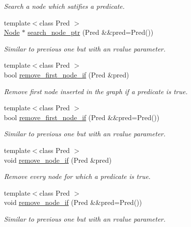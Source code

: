 \begin{DoxyCompactItemize}
\begin{DoxyCompactList}\small\item\em Search a node which satifies a predicate. \end{DoxyCompactList}\item 
{\footnotesize template$<$class Pred $>$ }\\\hyperlink{namespace_designar_a5af326c65aa2bd26b26c410f2030d09e}{Node} $\ast$ \hyperlink{class_designar_1_1_base_graph_af19f6876395f82edc748b8c7ec7413f8}{search\+\_\+node\+\_\+ptr} (Pred \&\&pred=Pred())
\begin{DoxyCompactList}\small\item\em Similar to previous one but with an rvalue parameter. \end{DoxyCompactList}\item 
{\footnotesize template$<$class Pred $>$ }\\bool \hyperlink{class_designar_1_1_base_graph_a1311af417ba4d373d7051b73cc2696ec}{remove\+\_\+first\+\_\+node\+\_\+if} (Pred \&pred)
\begin{DoxyCompactList}\small\item\em Remove first node inserted in the graph if a predicate is true. \end{DoxyCompactList}\item 
{\footnotesize template$<$class Pred $>$ }\\bool \hyperlink{class_designar_1_1_base_graph_aec049416b5240910cb04b1d6f55fcecf}{remove\+\_\+first\+\_\+node\+\_\+if} (Pred \&\&pred=Pred())
\begin{DoxyCompactList}\small\item\em Similar to previous one but with an rvalue parameter. \end{DoxyCompactList}\item 
{\footnotesize template$<$class Pred $>$ }\\void \hyperlink{class_designar_1_1_base_graph_aae56ca6b3b936835d07275f2ceb4b0d1}{remove\+\_\+node\+\_\+if} (Pred \&pred)
\begin{DoxyCompactList}\small\item\em Remove every node for which a predicate is true. \end{DoxyCompactList}\item 
{\footnotesize template$<$class Pred $>$ }\\void \hyperlink{class_designar_1_1_base_graph_a6e63659d272255254f6abc29c1e09724}{remove\+\_\+node\+\_\+if} (Pred \&\&pred=Pred())
\begin{DoxyCompactList}\small\item\em Similar to previous one but with an rvalue parameter. \end{DoxyCompactList}\item 

\end{DoxyCompactItemize}
